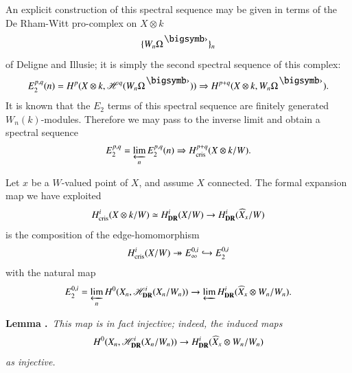 An explicit construction of this spectral sequence may be given in terms of the De Rham-Witt pro-complex on $X\otimes k$
$$
\{W_{n}\Omega^{\bigdot}\}_{n}
$$
of Deligne and Illusie; it is simply the second spectral sequence of this complex:
$$
E^{p,q}_{2}(n)=H^{p}(X\otimes k,\mathscr{H}^{q}(W_{n}\Omega^{\bigdot}))\Rightarrow H^{p+q}(X\otimes k, W_{n}\Omega^{\bigdot}).
$$
It is known that the $E_{2}$ terms of this spectral sequence are finitely generated $W_{n}(k)$-modules. Therefore we may pass to the inverse limit and obtain a spectral sequence
$$
E^{p,q}_{2}=\varprojlim\limits_{n}E^{p,q}_{2}(n)\Rightarrow H^{p+q}_{\operatorname{cris}}(X\otimes k/W).
$$

Let $x$ be a $W$-valued point of $X$, and assume $X$ connected. The formal expansion map we have exploited
$$
H^{i}_{\operatorname{cris}}(X\otimes k/W)\simeq H^{i}_{\mathbf{DR}}(X/W)\to H^{i}_{\mathbf{DR}}(\widehat{X}_{x}/W)
$$
is the composition of the edge-homomorphism
$$
H^{i}_{\operatorname{cris}}(X/W)\twoheadrightarrow E^{0,i}_{\infty}\hookrightarrow E^{0,i}_{2}
$$
with the natural map
$$
E^{0,i}_{2}=\varprojlim\limits_{n}H^{0}(X_{n},\mathscr{H}^{i}_{\mathbf{DR}}(X_{n}/W_{n}))\to \varprojlim H^{i}_{\mathbf{DR}}(\widehat{X}_{x}\otimes W_{n}/W_{n}).
$$\pageoriginale

\medskip
\noindent
{\bf Lemma .\label{art6-lem8.1}}~{\em This map is in fact injective; indeed, the induced maps}
$$
H^{0}(X_{n},\mathscr{H}^{i}_{\mathbf{DR}}(X_{n}/W_{n}))\to H^{i}_{\mathbf{DR}}(\widehat{X}_{x}\otimes W_{n}/W_{n})
$$
{\em as injective.}

